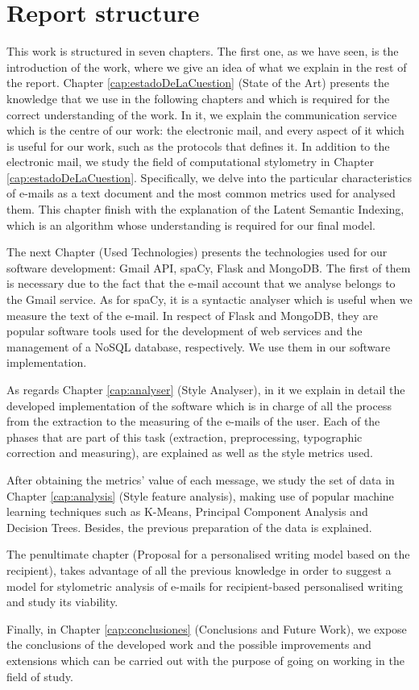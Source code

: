 \section{Report structure}\label{sect:structure}
This work is structured in seven chapters. The first one, as we have seen, is the introduction of the work, where we give an idea of what we explain in the rest of the report. Chapter \ref{cap:estadoDeLaCuestion} (State of the Art) presents the knowledge that we use in the following chapters and which is required for the correct understanding of the work. In it, we explain the communication service which is the centre of our work: the electronic mail, and every aspect of it  which is useful for our work, such as the protocols that defines it. In addition to the electronic mail, we study the field of computational stylometry in Chapter \ref{cap:estadoDeLaCuestion}. Specifically, we delve into the particular characteristics of e-mails as a text document and the most common metrics used for analysed them. This chapter finish with the explanation of the Latent Semantic Indexing, which is an algorithm whose understanding is required for our final model.

The next Chapter (Used Technologies) presents the technologies used for our software development: Gmail API, spaCy, Flask and MongoDB. The first of them is necessary due to the fact that the e-mail account that we analyse belongs to the Gmail service. As for spaCy, it is a syntactic analyser which is useful when we measure the text of the e-mail. In respect of Flask and MongoDB, they are popular software tools used for the development of web services and the management of a NoSQL database, respectively. We use them in our software implementation.

As regards Chapter \ref{cap:analyser} (Style Analyser), in it we explain in detail the developed implementation of the software which is in charge of all the process from the extraction to the measuring of the e-mails of the user. Each of the phases that are part of this task (extraction, preprocessing, typographic correction and measuring), are explained as well as the style metrics used.

After obtaining the metrics' value of each message, we study the set of data in Chapter \ref{cap:analysis} (Style feature analysis), making use of popular machine learning techniques such as K-Means, Principal Component Analysis and Decision Trees. Besides, the previous preparation of the data is explained.

The penultimate chapter (Proposal for a personalised writing model based on the recipient), takes advantage of all the previous knowledge in order to suggest a model for stylometric analysis of e-mails for recipient-based personalised writing and study its viability.

Finally, in Chapter \ref{cap:conclusiones} (Conclusions and Future Work), we expose the conclusions of the developed work and the possible improvements and extensions which can be carried out with the purpose of going on working in the field of study.